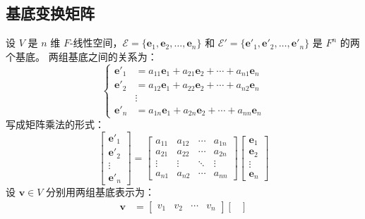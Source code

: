 \vspace{1em}

\subsection{基底变换矩阵}

\begin{definition}[坐标变换矩阵]
    设 $V$ 是 $n$ 维 $F$-线性空间，$\mathcal{E} = \{\mathbf{e}_1,\mathbf{e}_2,\ldots,\mathbf{e}_n\}$ 和 $\mathcal{E}' = \{\mathbf{e}'_1,\mathbf{e}'_2,\ldots,\mathbf{e}'_n\}$ 是 $F^n$ 的两个基底。
    两组基底之间的关系为：
    \[
        \begin{cases}
            \mathbf{e}'_1 &= a_{11}\mathbf{e}_1 + a_{21}\mathbf{e}_2 + \cdots + a_{n1}\mathbf{e}_n \\
            \mathbf{e}'_2 &= a_{12}\mathbf{e}_1 + a_{22}\mathbf{e}_2 + \cdots + a_{n2}\mathbf{e}_n \\
            &\vdots \\
            \mathbf{e}'_n &= a_{1n}\mathbf{e}_1 + a_{2n}\mathbf{e}_2 + \cdots + a_{nn}\mathbf{e}_n
        \end{cases}
    \]
    写成矩阵乘法的形式：
    \[
        \begin{bmatrix}
            \mathbf{e}'_1 \\ \mathbf{e}'_2 \\ \vdots \\ \mathbf{e}'_n
        \end{bmatrix} =
        \begin{bmatrix}
            a_{11} & a_{12} & \cdots & a_{1n} \\
            a_{21} & a_{22} & \cdots & a_{2n} \\
            \vdots & \vdots & \ddots & \vdots \\
            a_{n1} & a_{n2} & \cdots & a_{nn}
        \end{bmatrix}
        \begin{bmatrix}
            \mathbf{e}_1 \\ \mathbf{e}_2 \\ \vdots \\ \mathbf{e}_n
        \end{bmatrix}
    \]
    设 $\mathbf{v}\in V$ 分别用两组基底表示为：
    \begin{align*}
        \mathbf{v} &= \begin{bmatrix}
            v_1 & v_2 & \cdots & v_n
        \end{bmatrix}\begin{bmatrix}

\end{bmatrix}
\end{align*}
\end{definition}
